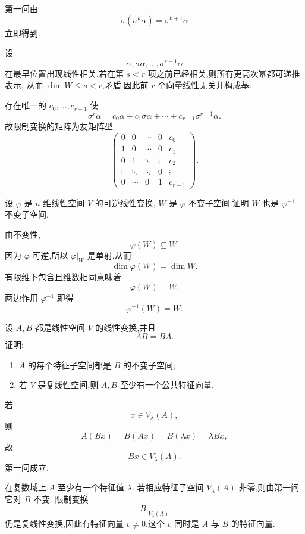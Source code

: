 \begin{solution}
第一问由
\[
\sigma(\sigma^k\alpha)=\sigma^{k+1}\alpha
\]
立即得到.

设
\[
\alpha,\sigma\alpha,\ldots,\sigma^{r-1}\alpha
\]
在最早位置出现线性相关.若在第 $s<r$ 项之前已经相关,则所有更高次幂都可递推表示,
从而 $\dim W\leq s<r$,矛盾.因此前 $r$ 个向量线性无关并构成基.

存在唯一的 $c_0,\ldots,c_{r-1}$ 使
\[
\sigma^r\alpha
=
c_0\alpha+c_1\sigma\alpha+\cdots+c_{r-1}\sigma^{r-1}\alpha.
\]
故限制变换的矩阵为友矩阵型
\[
\boxed{
\begin{pmatrix}
0&0&\cdots&0&c_0\\
1&0&\cdots&0&c_1\\
0&1&\ddots&\vdots&c_2\\
\vdots&\ddots&\ddots&0&\vdots\\
0&\cdots&0&1&c_{r-1}
\end{pmatrix}.
}
\]
\end{solution}


\begin{example}
设 $\varphi$ 是 $n$ 维线性空间 $V$ 的可逆线性变换,
$W$ 是 $\varphi$-不变子空间.证明 $W$ 也是 $\varphi^{-1}$-不变子空间.
\end{example}
\exampleblank

\begin{solution}
由不变性,
\[
\varphi(W)\subseteq W.
\]
因为 $\varphi$ 可逆,所以 $\varphi|_W$ 是单射,从而
\[
\dim\varphi(W)=\dim W.
\]
有限维下包含且维数相同意味着
\[
\varphi(W)=W.
\]
两边作用 $\varphi^{-1}$ 即得
\[
\varphi^{-1}(W)=W.
\]
\end{solution}


\begin{example}[\markstar]
设 $A,B$ 都是线性空间 $V$ 的线性变换,并且
\[
AB=BA.
\]
证明:
\begin{enumerate}
    \item $A$ 的每个特征子空间都是 $B$ 的不变子空间;
    \item 若 $V$ 是复线性空间,则 $A,B$ 至少有一个公共特征向量.
\end{enumerate}
\end{example}
\exampleblank

\begin{solution}
若
\[
x\in V_\lambda(A),
\]
则
\[
A(Bx)=B(Ax)=B(\lambda x)=\lambda Bx,
\]
故
\[
Bx\in V_\lambda(A).
\]
第一问成立.

在复数域上,$A$ 至少有一个特征值 $\lambda$.
若相应特征子空间 $V_\lambda(A)$ 非零,则由第一问它对 $B$ 不变.
限制变换
\[
B|_{V_\lambda(A)}
\]
仍是复线性变换,因此有特征向量 $v\neq0$.这个 $v$ 同时是 $A$ 与 $B$ 的特征向量.
\end{solution}


